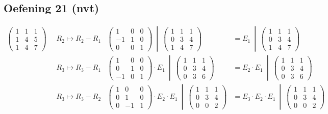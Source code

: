 \documentclass[lineaire_algebra_oplossingen.tex]{subfiles}
\begin{document}
\subsection{Oefening 21 (nvt)}
\begin{align*}
\begin{pmatrix}
1 & 1 & 1\\
1 & 4 & 5\\
1 & 4 & 7
\end{pmatrix}\;\;
&R_2 \longmapsto R_2-R_1
&\left.\begin{pmatrix}
1 & 0 & 0\\
-1 & 1 & 0\\
0 & 0 & 1
\end{pmatrix}
\ \middle|\ 
\begin{pmatrix}
1 & 1 & 1\\
0 & 3 & 4\\
1 & 4 & 7
\end{pmatrix}\right.
&=\left.
E_1
\ \middle|\ 
\begin{pmatrix}
1 & 1 & 1\\
0 & 3 & 4\\
1 & 4 & 7
\end{pmatrix}\right. \\
&R_3 \longmapsto R_3-R_1
&\left.\begin{pmatrix}
1 & 0 & 0\\
0 & 1 & 0\\
-1 & 0 & 1
\end{pmatrix}
\cdot E_1
\ \middle|\ 
\begin{pmatrix}
1 & 1 & 1\\
0 & 3 & 4\\
0 & 3 & 6
\end{pmatrix}\right.
&=\left.
E_2 \cdot E_1
\ \middle|\ 
\begin{pmatrix}
1 & 1 & 1\\
0 & 3 & 4\\
0 & 3 & 6
\end{pmatrix}\right. \\
&R_3 \longmapsto R_3-R_2
&\left.\begin{pmatrix}
1 & 0 & 0\\
0 & 1 & 0\\
0 & -1 & 1
\end{pmatrix}
\cdot E_2 \cdot E_1
\ \middle|\ 
\begin{pmatrix}
1 & 1 & 1\\
0 & 3 & 4\\
0 & 0 & 2
\end{pmatrix}\right.
&=\left.
E_3 \cdot E_2 \cdot E_1
\ \middle|\ 
\begin{pmatrix}
1 & 1 & 1\\
0 & 3 & 4\\
0 & 0 & 2
\end{pmatrix}\right.
\end{align*}
\end{document}
